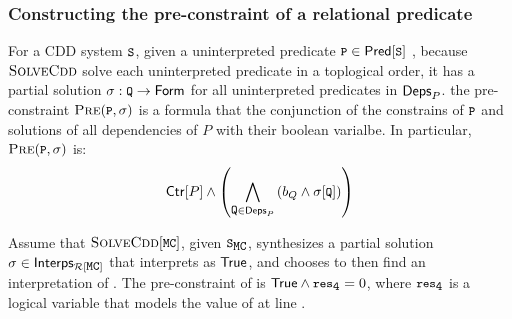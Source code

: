 \subsubsection{Constructing the pre-constraint of a relational predicate}
\label{sec:cons-pre}
%
For a CDD system $\cc{S}$, given a uninterpreted predicate $\cc{P} \in \predof{\cc{S}}$
, because $\textsc{SolveCdd}$ solve each uninterpreted predicate in a toplogical order, 
it has a partial solution $\sigma : \cc{Q} \to \formula$ for all uninterpreted predicates in
$\mathsf{Deps}_{P}$.
%
the pre-constraint $\prectr(\cc{P},\sigma)$ is a formula that the conjunction of the constrains
of $\cc{P}$ and solutions of all dependencies of $P$ with their boolean varialbe.
%
In particular, $\prectr(\cc{P},\sigma)$ is:
\[\ctrof{P} \land
\left(
\bigland_{\cc{Q} \in \depsof{P}}
\left(b_Q \land \sigma[ \cc{Q} ]  \right)
\right)
\]
%
\begin{ex}
  \label{ex:pre-ctr}
  Assume that $\mcsolve$, given $\mcchc$, synthesizes a partial
  solution $\sigma \in \interps{ \mcpreds }$ that interprets 
  as $\mathsf{True}$, and chooses to then find an interpretation of .
  The pre-constraint of  is $\true \land \cc{res}_{\cc{4}} =
  0$, where $\cc{res}_{\cc{4}}$ is a logical variable that models the
  value of  at line .
\end{ex}

